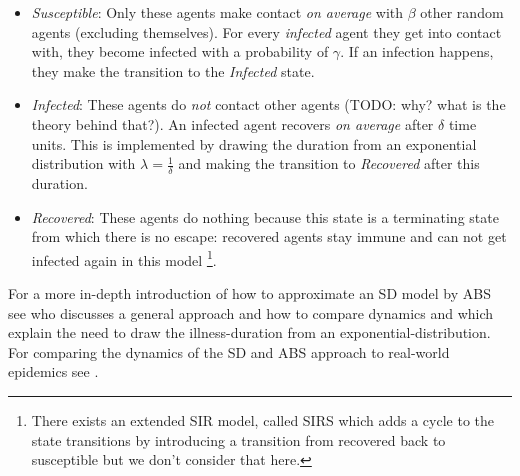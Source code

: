 \begin{itemize}
	\item \textit{Susceptible}: Only these agents make contact \textit{on average} with $\beta$ other random agents (excluding themselves). For every \textit{infected} agent they get into contact with, they become infected with a probability of $\gamma$. If an infection happens, they make the transition to the \textit{Infected} state.

	\item \textit{Infected}: These agents do \textit{not} contact other agents (TODO: why? what is the theory behind that?). An infected agent recovers \textit{on average} after $\delta$ time units. This is implemented by drawing the duration from an exponential distribution \cite{borshchev_system_2004} with $\lambda = \frac{1}{\delta}$ and making the transition to \textit{Recovered} after this duration.

	\item \textit{Recovered}: These agents do nothing because this state is a terminating state from which there is no escape: recovered agents stay immune and can not get infected again in this model \footnote{There exists an extended SIR model, called SIRS which adds a cycle to the state transitions by introducing a transition from recovered back to susceptible but we don't consider that here.}.
\end{itemize}

For a more in-depth introduction of how to approximate an SD model by ABS see \cite{macal_agent-based_2010} who discusses a general approach and how to compare dynamics and \cite{borshchev_system_2004} which explain the need to draw the illness-duration from an exponential-distribution. For comparing the dynamics of the SD and ABS approach to real-world epidemics see \cite{ahmed_variance_2013}.
